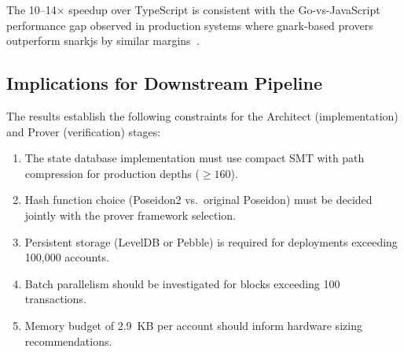 The 10--14$\times$ speedup over TypeScript is consistent with the
Go-vs-JavaScript performance gap observed in production systems
where gnark-based provers outperform snarkjs by similar
margins~\cite{chaliasos2024analyzing}.

\subsection{Implications for Downstream Pipeline}

The results establish the following constraints for the Architect
(implementation) and Prover (verification) stages:

\begin{enumerate}
  \item The state database implementation must use compact SMT with
    path compression for production depths ($\geq 160$).
  \item Hash function choice (Poseidon2 vs.\ original Poseidon)
    must be decided jointly with the prover framework selection.
  \item Persistent storage (LevelDB or Pebble) is required for
    deployments exceeding 100,000 accounts.
  \item Batch parallelism should be investigated for blocks
    exceeding 100 transactions.
  \item Memory budget of 2.9~KB per account should inform
    hardware sizing recommendations.
\end{enumerate}
